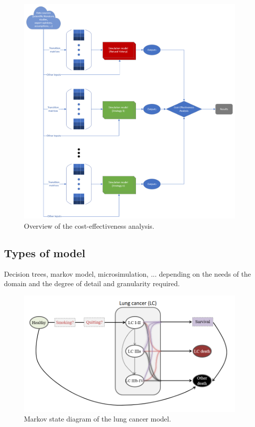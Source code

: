 \begin{figure}[h]
	\centering
	\includegraphics[width=\textwidth]{figures/cea_overview}
	\decoRule
	\caption[CEA overview]{Overview of the cost-effectiveness analysis.}
	\label{fig:cea_overview}
\end{figure}

\subsection{Types of model}
Decision trees, markov model, microsimulation, ... depending on the needs of the domain and the degree of detail and granularity required.

\begin{figure}[h]
	\centering
	\includegraphics[width=\textwidth]{figures/lung_markov}
	\decoRule
	\caption[Markov state diagram]{Markov state diagram of the lung cancer model.}
	\label{fig:lung_markov}
\end{figure}

